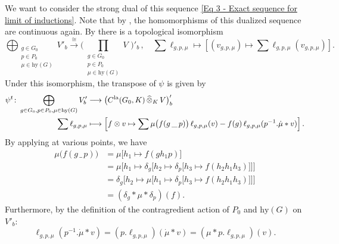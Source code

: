 \documentclass[a4paper, reqno, 10pt]{amsart}
\theoremstyle{definition}
\numberwithin{equation}{section}
\newcommand{\blank}{{\,\_\,}}
\newcommand{\cotimes}[1]{{\,\widehat{\otimes}_{#1}\,}}
\newcommand{\hy}{{\mathrm{hy}}}
\newcommand{\lra}{\longrightarrow}
\newcommand{\lto}{\longmapsto}
\newcommand{\mto}{\mapsto}
\begin{document}
We want to consider the strong dual of this sequence \eqref{Eq 3 - Exact sequence for limit of inductions}.
Note that by \cite[Rmk.\ 16.1 (ii)]{Schneider02NonArchFunctAna}, the homomorphisms of this dualized sequence are continuous again.
By \cite[Prop.\ 9.11]{Schneider02NonArchFunctAna} there is a topological isomorphism
\begin{equation*}
	\bigoplus_{\substack{g\in G_0\\ p\in P_0 \\\mu \in \hy(G)}} V'_b \overset{\cong}{\lra} \Bigg( \prod_{\substack{g\in G_0\\ p\in P_0 \\\mu \in \hy(G)}} \!\!V\,\, \Bigg)'_b \,,\quad
	\sum \ell_{g,p,\mu} \lto \left[ (v_{g,p,\mu}) \mto \sum \ell_{g,p,\mu}(v_{g,p,\mu}) \right] .
\end{equation*}
Under this isomorphism, the transpose of $\psi$ is given by 
\begin{align*}
	\psi^t \colon \bigoplus_{g\in G_0, p\in P_0 , \mu \in \hy(G)} V'_b &\lra \big( C^{\rm la}(G_0,K) \cotimes{K} V \big)'_b \\
	\sum \ell_{g,p,\mu} &\lto \left[ f\otimes v \mto \sum \mu \big( f(g \blank p) \big) \, \ell_{g,p,\mu}(v) - f(g) \, \ell_{g,p,\mu} (p^{-1}.\dot{\mu}\ast v) \right] .
\end{align*}
By applying  at various points, we have
\begin{align*}
	\mu \big( f(g\blank p) \big) &= \mu \big[  h_1 \mto f(gh_1 p)  \big]\\
	&= \mu \big[ h_1 \mto \delta_g  \big[ h_2\mto \delta_p \big[ h_3 \mto f(h_2 h_1 h_3) \big] \big] \big] \\
	&= \delta_g \big[ h_2 \mto \mu \big[ h_1 \mto \delta_p \big[ h_3 \mto f(h_2 h_1 h_3) \big] \big] \big] \\
	&= (\delta_g \ast \mu \ast \delta_p)(f) .
\end{align*}
Furthermore, by the definition of the contragredient action of $P_0$ and $\hy(G)$ on $V'_b$:
\[ \ell_{g,p,\mu}(p^{-1}.\dot{\mu}\ast v) = (p.\ell_{g,p,\mu})(\dot{\mu} \ast v) = (\mu\ast p.\ell_{g,p,\mu})(v) . \]
\end{document}
